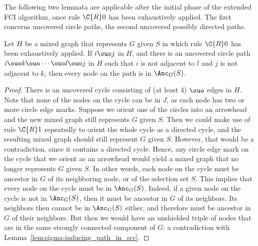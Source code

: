 The following two lemmata are applicable after the initial phase of the extended FCI algorithm, once rule $\C{R}0$ has been exhaustively applied.
The first concerns uncovered circle paths, the second uncovered possibly directed paths.
\begin{Lem}\label{lem:detecting_selection_bias}
  Let $H$ be a mixed graph that represents $G$ given $S$ in which rule $\C{R}0$ has been exhaustively applied.
  If $i \ouo j$ in $H$, and there is an uncovered circle path $i \ouo k \ouo \cdots \ouo l \ouo j$ in $H$ such that $i$ is not adjacent to $l$ and $j$ is not adjacent to $k$, then every node on the path is in $\Anc_G(S)$.
\end{Lem}
\begin{proof}
  There is an uncovered cycle consisting of (at least 4) $\ouo$ edges in $H$. 
  Note that none of the nodes on the cycle can be in $J$, as each node has two or more circle edge marks.
  Suppose we orient one of the circles into an arrowhead and the new mixed graph still represents $G$ given $S$.
  Then we could make use of rule $\C{R}1$ repeatedly to orient the whole cycle as a directed cycle, and the resulting mixed graph should still represent $G$ given $S$.
  However, that would be a contradiction, since it contains a directed cycle.
  Hence, any circle edge mark on the cycle that we orient as an arrowhead would yield a mixed graph that no longer represents $G$ given $S$.
  In other words, each node on the cycle must be ancestor in $G$ of its neighboring node, or of the selection set $S$.
  This implies that every node on the cycle must be in $\Anc_G(S)$.
  Indeed, if a given node on the cycle is not in $\Anc_G(S)$, then it must be ancestor in $G$ of its neighbors.
  Its neighbors then cannot be in $\Anc_G(S)$ either, and therefore must be ancestor in $G$ of their neighbors.
  But then we would have an unshielded triple of nodes that are in the same strongly connected component of $G$: a contradiction with Lemma~\ref{lem:sigma-inducing_path_in_scc}.
\end{proof}

